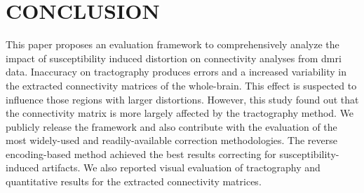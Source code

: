 \section{CONCLUSION}

This paper proposes an evaluation framework to
comprehensively analyze the impact of susceptibility
induced distortion on connectivity analyses from \gls*{dmri}
data. Inaccuracy on tractography produces errors
and a increased variability in the extracted connectivity 
matrices of the whole-brain. This effect is suspected
to influence those regions with larger distortions.
However, this study found out that the connectivity
matrix is more largely affected by the tractography method.
We publicly release the framework and also contribute
with the evaluation of the most widely-used and
readily-available correction methodologies. 
The reverse encoding-based method achieved the
best results correcting for susceptibility-induced 
artifacts. We also reported visual evaluation of 
tractography and quantitative results for the 
extracted connectivity matrices.